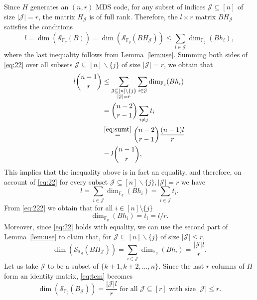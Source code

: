 \documentclass[11pt,onecolumn]{IEEEtran}
\newcommand{\cJ}{\mathcal{J}}
\newcommand{\cS}{\mathcal{S}}
\begin{document}
Since $H$ generates an $(n,r)$ MDS code, for any subset of indices $\cJ \subseteq [n]$ of size $|\cJ|=r$, the matrix $H_{\cJ}$ is of full rank. %
Therefore, the $l\times r$ matrix $BH_{\cJ}$ satisfies the conditions
    \begin{equation}
l=\dim(\cS_{{\mathbb F}_q}(B))=\dim(\cS_{{\mathbb F}_q}(BH_{\cJ}))\leq \sum_{i\in \cJ}\dim_{\mathbb{F}_q}(Bh_i),
\label{eq:22}
\end{equation} 
where the last inequality follows from Lemma~\ref{lem:use}.
Summing both sides of  \eqref{eq:22} over all subsets $\cJ\subseteq [n]\backslash\{j\}$ of size $|\cJ|=r$, we obtain that
\begin{equation}\label{eq:sand}
\begin{aligned}
l \binom{n-1}{r}&\leq \sum_{\substack{\cJ \subseteq [n]\backslash\{j\} \\|\cJ|=r}}\sum_{i\in \cJ}\dim_{\mathbb{F}_q}(Bh_i) \\
&=\binom{n-2}{r-1}\sum_{i\neq j}t_i  \\
&\overset{\eqref{eq:sumt}}{=} \binom{n-2}{r-1}\frac{(n-1) l}{r}  \\
&=l\binom{n-1}{r},
\end{aligned}
\end{equation}
 This implies that the inequality above is in fact an equality, and therefore, on account of \eqref{eq:22} for every subset $\cJ\subseteq [n]\backslash\{j\},|\cJ|=r$ we have
\begin{equation}
l =\sum_{i\in \cJ}\dim_{\mathbb{F}_q}(Bh_i)=\sum_{i\in \cJ}t_i.
\label{eq:222}
\end{equation}
From \eqref{eq:222} we obtain that for all $i\in[n]\setminus\{j\}$ 
\begin{equation}\label{eq:sing}
\dim_{\mathbb{F}_q}(Bh_i)=t_i=l/r.
\end{equation}
Moreover, since \eqref{eq:22} holds with equality, we can use the second part of Lemma~\ref{lem:use} to claim that, for 
$\cJ\subseteq [n]\backslash\{j\}$ of size $|\cJ|\le r,$
    \begin{equation}\label{eq:tem}
\dim(\cS_{\mathbb{F}_q}(BH_{\cJ}))
= \sum_{i\in \cJ}\dim_{\mathbb{F}_q}(Bh_i)
= \frac{|\cJ|l}{r}. 
    \end{equation}
Let us take $\cJ$ to be a subset of $\{k+1,k+2,\dots,n\}.$ 
Since the last $r$ columns of $H$ form an identity matrix, \eqref{eq:tem} becomes
    \begin{equation}\label{eq:subm}
\dim(\cS_{\mathbb{F}_q}(B_{\cJ}))
= \frac{|\cJ|l}{r} 
\text{~for all~} \cJ\subseteq [r] \text{~with size~} |\cJ|\le r.
   \end{equation}
\end{document}
